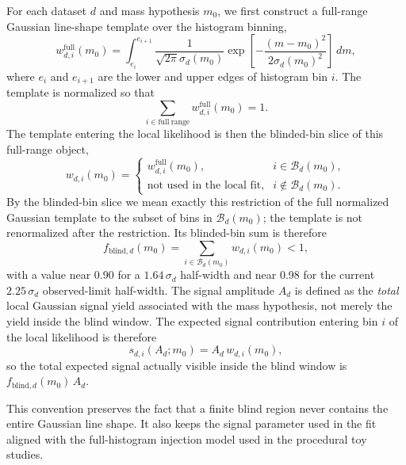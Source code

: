 For each dataset $d$ and mass hypothesis $m_0$, we first construct a
full-range Gaussian line-shape template over the histogram binning,
\begin{equation}
w^{\mathrm{full}}_{d,i}(m_0) =
\int_{e_i}^{e_{i+1}}
\frac{1}{\sqrt{2\pi}\sigma_d(m_0)}
\exp\!\left[-\frac{(m-m_0)^2}{2\sigma_d(m_0)^2}\right]\,dm,
\end{equation}
where $e_i$ and $e_{i+1}$ are the lower and upper edges of histogram bin $i$.
The template is normalized so that
\begin{equation}
\sum_{i \in \mathrm{full\ range}} w^{\mathrm{full}}_{d,i}(m_0) = 1.
\end{equation}
The template entering the local likelihood is then the blinded-bin slice of this
full-range object,
\begin{equation}
w_{d,i}(m_0) =
\begin{cases}
w^{\mathrm{full}}_{d,i}(m_0), & i \in \mathcal{B}_d(m_0), \\
\text{not used in the local fit}, & i \notin \mathcal{B}_d(m_0).
\end{cases}
\label{eq:window-template}
\end{equation}
By the blinded-bin slice we mean exactly this restriction of the full normalized
Gaussian template to the subset of bins in $\mathcal{B}_d(m_0)$; the template is not
renormalized after the restriction.
Its blinded-bin sum is therefore
\begin{equation}
f_{\mathrm{blind},d}(m_0) = \sum_{i \in \mathcal{B}_d(m_0)} w_{d,i}(m_0) < 1,
\end{equation}
with a value near 0.90 for a $1.64\,\sigma_d$ half-width and near 0.98 for the current
$2.25\,\sigma_d$ observed-limit half-width. The signal
amplitude $A_d$ is defined as the \emph{total} local Gaussian signal yield associated
with the mass hypothesis, not merely the yield inside the blind window. The expected
signal contribution entering bin $i$ of the local likelihood is therefore
\begin{equation}
s_{d,i}(A_d;m_0) = A_d\,w_{d,i}(m_0),
\label{eq:signal-bin-contribution}
\end{equation}
so the total expected signal actually visible inside the blind window is
$f_{\mathrm{blind},d}(m_0)\,A_d$.

This convention preserves the fact that a finite blind region never contains the
entire Gaussian line shape. It
also keeps the signal parameter used in the fit aligned with the full-histogram
injection model used in the procedural toy studies.

